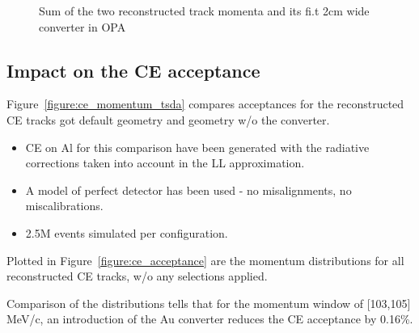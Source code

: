 \begin{figure}[H]
  \caption{
    \label{figure:t2_1_smom_0}
    Sum of the two reconstructed track momenta and its fi.t 2cm wide converter in OPA
  }
  \label{figure:event_display}
\end{figure}

\newpage
\subsection{Impact on the CE acceptance}

Figure~\ref{figure:ce_momentum_tsda} compares acceptances for the reconstructed CE tracks
got default geometry and geometry w/o the converter.
\begin{itemize}
\item 
  CE on Al for this comparison have been generated with the radiative corrections
  taken into account in the LL approximation.
\item 
  A model of perfect detector has been used - no misalignments, no miscalibrations.
\item
  2.5M events simulated per configuration.
\end{itemize}

Plotted in Figure~\ref{figure:ce_acceptance} are the momentum distributions for all
reconstructed CE tracks, w/o any selections applied. 

Comparison of the distributions tells that for the momentum window of [103,105] MeV/c,
an introduction of the Au converter reduces the CE acceptance by 0.16\%.

